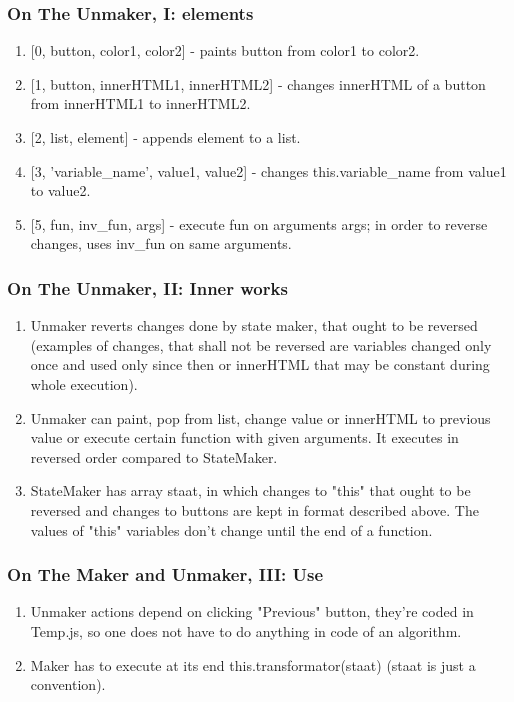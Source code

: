 \documentclass[12pt]{article}
\begin{document}
\subsubsection{On The Unmaker, I: elements}
\begin {enumerate}
	\item {[0, button, color1, color2]} - paints button from color1 to color2.
	\item {[1, button, innerHTML1, innerHTML2]} - changes innerHTML of a button from innerHTML1 to innerHTML2.
	\item {[2, list, element]} - appends element to a list.
	\item {[3, 'variable\_name', value1, value2]} - changes this.variable\_name from value1 to value2.
	\item {[5, fun, inv\_fun, args]} - execute fun on arguments args; in order to reverse changes, uses inv\_fun on same arguments.
\end{enumerate}

\subsubsection{On The Unmaker, II: Inner works}
\begin {enumerate}
	\item Unmaker reverts changes done by state maker, that ought to be reversed (examples of changes, that shall not be reversed are variables changed only once and used only since then or innerHTML that may be constant during whole execution).
	\item Unmaker can paint, pop from list, change value or innerHTML to previous value or execute certain function with given arguments. It executes in reversed order compared to StateMaker.
	\item StateMaker has array staat, in which changes to "this" that ought to be reversed and changes to buttons are kept in format described above. The values of "this" variables don't change until the end of a function.
\end {enumerate}

\subsubsection{On The Maker and Unmaker, III: Use}
\begin {enumerate}
	\item Unmaker actions depend on clicking "Previous" button, they're coded in Temp.js, so one does not have to do anything in code of an algorithm.
	\item Maker has to execute at its end this.transformator(staat) (staat is just a convention).
\end {enumerate}
\end{document}
